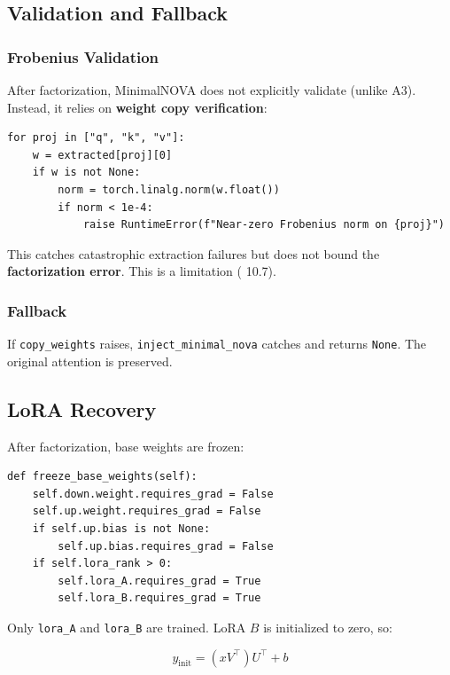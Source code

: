 \subsection{Validation and Fallback}

\subsubsection{Frobenius Validation}

After factorization, MinimalNOVA does not explicitly validate (unlike A3). 
Instead, it relies on \textbf{weight copy verification}:

\begin{lstlisting}
for proj in ["q", "k", "v"]:
    w = extracted[proj][0]
    if w is not None:
        norm = torch.linalg.norm(w.float())
        if norm < 1e-4:
            raise RuntimeError(f"Near-zero Frobenius norm on {proj}")
\end{lstlisting}

This catches catastrophic extraction failures but does not bound the 
\textbf{factorization error}. This is a limitation ( 10.7).

\subsubsection{Fallback}

If \texttt{copy\_weights} raises, \texttt{inject\_minimal\_nova} catches and returns \texttt{None}. 
The original attention is preserved.

\subsection{LoRA Recovery}

After factorization, base weights are frozen:

\begin{lstlisting}
def freeze_base_weights(self):
    self.down.weight.requires_grad = False
    self.up.weight.requires_grad = False
    if self.up.bias is not None:
        self.up.bias.requires_grad = False
    if self.lora_rank > 0:
        self.lora_A.requires_grad = True
        self.lora_B.requires_grad = True
\end{lstlisting}

Only \texttt{lora\_A} and \texttt{lora\_B} are trained. LoRA $B$ is initialized to zero, so:

\[
y_{\text{init}} = (x V^\top) U^\top + b
\tag{4.8}
\]

